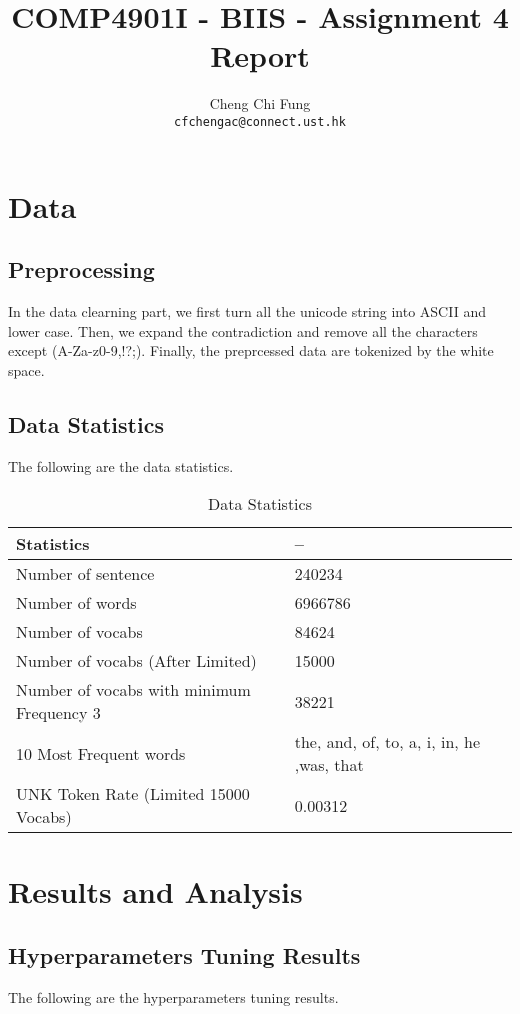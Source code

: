 \documentclass{article}
\title{COMP4901I - BIIS - Assignment 4 Report}
\author{%
	Cheng Chi Fung \\
	\texttt{cfchengac@connect.ust.hk} \\
}
\begin{document}
\maketitle

\section{Data}

\subsection{Preprocessing}

In the data clearning part, we first turn all the unicode string into ASCII and lower case. Then, we expand the contradiction and remove all the characters except (A-Za-z0-9,!?;). Finally, the preprcessed data are tokenized by the white space. 

\subsection{Data Statistics}
The following are the data statistics.

\begin{table}[htb]
	\caption{Data Statistics}
	\label{sample-table}
	\centering
	\begin{tabular}{ll}
		\toprule
		\cmidrule{1-2}
		Statistics & --  \\
		\midrule
		Number of sentence & 240234 \\
		Number of words & 6966786  \\
		Number of vocabs & 84624 \\
		Number of vocabs (After Limited) & 15000 \\
		Number of vocabs with minimum Frequency 3 & 38221 \\
		10 Most Frequent words & the, and, of, to, a, i, in, he ,was, that \\
		UNK Token Rate (Limited 15000 Vocabs) & 0.00312 \\
		\bottomrule
	\end{tabular}
\end{table}

\section{Results and Analysis}

\subsection{Hyperparameters Tuning Results}
The following are the hyperparameters tuning results.
\end{document}
